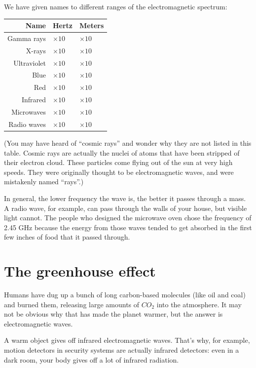 We have given names to different ranges of the electromagnetic spectrum:
\begin{tabular}{r | l | l}
  Name & Hertz & Meters \\
  \hline
Gamma rays  & $  \times 10^{}$ &$ \times 10^{}$\\
X-rays  & $ \times 10^{}$&$ \times 10^{}$\\
Ultraviolet  & $ \times 10^{}$&$ \times 10^{}$\\
Blue & $ \times 10^{}$&$ \times 10^{}$\\
Red  & $ \times 10^{}$&$ \times 10^{}$\\
Infrared  & $ \times 10^{}$&$ \times 10^{}$\\
Microwaves  & $ \times 10^{}$&$ \times 10^{}$\\
Radio waves  & $ \times 10^{}$&$ \times 10^{}$\\
\end{tabular}

(You may have heard of ``cosmic rays'' and wonder why they are
not listed in this table. Cosmic rays are actually the nuclei of atoms
that have been stripped of their electron cloud. These particles come
flying out of the sun at very high speeds. They were originally
thought to be electromagnetic waves, and were mistakenly named
``rays''.)

In general, the lower frequency the wave is, the better it passes
through a mass.  A radio wave, for example, can pass through the walls
of your house, but visible light cannot.  The people who designed the
microwave oven chose the frequency of 2.45 GHz because the energy
from those waves tended to get absorbed in the first few inches of
food that it passed through.

\section{The greenhouse effect}

Humans have dug up a bunch of long carbon-based molecules (like oil
and coal) and burned them, releasing large amounts of $CO_2$ into the
atmosphere. It may not be obvious why that has made the planet warmer, but the
answer is electromagnetic waves.

A warm object gives off infrared electromagnetic waves. That's why,
for example, motion detectors in security systems are actually
infrared detectors: even in a dark room, your body gives off a lot of
infrared radiation.

